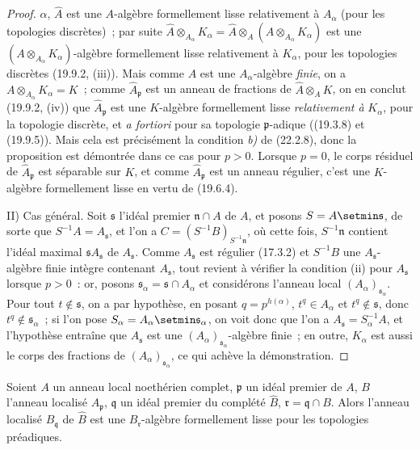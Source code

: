 \begin{proof}
$\alpha$, $\widehat A$ est une $A$-algèbre formellement lisse relativement
à $A_\alpha$ (pour les topologies discrètes)~; par suite
$\widehat A\otimes_{A_\alpha}K_\alpha=\widehat A\otimes_A(A\otimes_{A_\alpha}K_\alpha)$
est une $(A\otimes_{A_\alpha}K_\alpha)$-algèbre formellement lisse
relativement à $K_\alpha$, pour les topologies discrètes (19.9.2, (iii)).
Mais comme $A$ est une $A_\alpha$-algèbre \emph{finie}, on a
$A\otimes_{A_\alpha}K_\alpha=K$~; comme $\widehat A_\mathfrak p$ est un
anneau de fractions de $\widehat A\otimes_A K$, on en conclut (19.9.2,
(iv)) que $\widehat A_\mathfrak p$ est une $K$-algèbre formellement lisse
\emph{relativement à} $K_\alpha$, pour la topologie discrète, et \emph{a fortiori}
pour sa topologie $\mathfrak p$-adique ((19.3.8) et (19.9.5)). Mais cela est
précisément la condition \emph{b)} de (22.2.8), donc la proposition est démontrée
dans ce cas pour $p>0$. Lorsque $p=0$, le corps résiduel de
$\widehat A_\mathfrak p$ est séparable sur $K$, et comme
$\widehat A_\mathfrak p$ est un anneau régulier, c'est une $K$-algèbre
formellement lisse en vertu de (19.6.4).

II) Cas général. Soit $\mathfrak s$ l'idéal premier $\mathfrak n\cap A$ de
$A$, et posons $S=A\setmin\mathfrak s$, de sorte que $S^{-1}A=A_\mathfrak s$, et
l'on a $C=(S^{-1}B)_{S^{-1}\mathfrak n}$, où cette fois,
$S^{-1}\mathfrak n$ contient l'idéal maximal
$\mathfrak sA_\mathfrak s$ de $A_\mathfrak s$. Comme $A_\mathfrak s$ est
régulier (17.3.2) et $S^{-1}B$ une $A_\mathfrak s$-algèbre finie intègre
contenant $A_\mathfrak s$, tout revient à vérifier la condition (ii) pour
$A_\mathfrak s$ lorsque $p>0$~: or, posons
$\mathfrak s_\alpha=\mathfrak s\cap A_\alpha$ et considérons l'anneau local
$(A_\alpha)_{\mathfrak s_\alpha}$. Pour tout $t\notin\mathfrak s$, on a par
hypothèse, en posant $q=p^{h(\alpha)}$, $t^q\in A_\alpha$ et
$t^q\notin\mathfrak s$, donc $t^q\notin\mathfrak s_\alpha$~; si l'on pose
$S_\alpha=A_\alpha\setmin\mathfrak s_\alpha$, on voit donc que l'on a
$A_\mathfrak s=S_\alpha^{-1}A$, et l'hypothèse entraîne que
$A_\mathfrak s$ est une $(A_\alpha)_{\mathfrak s_\alpha}$-algèbre finie~;
en outre, $K_\alpha$ est aussi le corps des fractions de
$(A_\alpha)_{\mathfrak s_\alpha}$, ce qui achève la démonstration.
\end{proof}

\begin{theorem}[22.3.3]
\label{0.22.3.3-fr}
Soient $A$ un anneau local noethérien \textup{complet}, $\mathfrak p$ un idéal
premier de $A$, $B$ l'anneau localisé $A_\mathfrak p$, $\mathfrak q$ un
idéal premier du complété $\widehat B$, $\mathfrak r=\mathfrak q\cap B$.
Alors l'anneau localisé $\widehat B_\mathfrak q$ de $\widehat B$ est une
$B_\mathfrak r$-algèbre formellement lisse pour les topologies préadiques.
\end{theorem}

